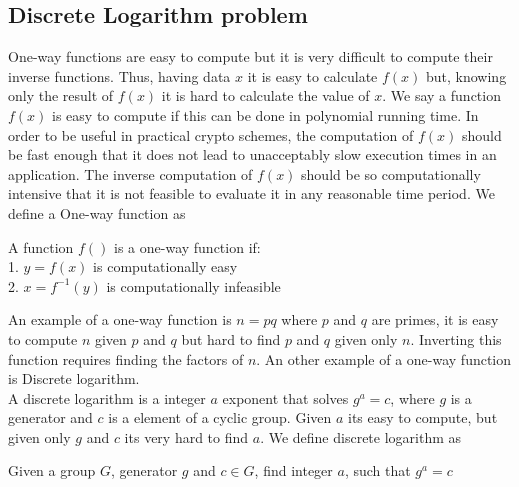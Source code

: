 \subsection{Discrete Logarithm problem} %

 One-way functions are easy to compute but it is very difficult to compute their inverse functions. Thus, having data $x$ it is easy to calculate $f(x)$ but,  
knowing only the result of $f(x)$ it is hard to calculate the value of $x$. We say a function $f(x)$ is easy to compute if this can be done in polynomial running time. 
In order to be useful in practical crypto schemes, the computation of $f(x)$ should be fast enough that it does not lead to unacceptably slow execution times in an application. The inverse
computation of $f(x)$ should be so computationally intensive that it is not feasible to evaluate it in any reasonable time period. We define a One-way function as \\

\begin{defi}
A function $f()$ is a one-way function if:      \\
1. $y = f (x)$ is computationally easy           \\
2. $x = f^{-1}(y)$ is computationally infeasible    
\end{defi}

\noindent
An example of a one-way function is $n = pq$ where $p$ and $q$ are primes, it is easy to compute $n$ given $p$ and $q$ but hard to find $p$ and $q$ given only $n$. 
Inverting this function requires finding the factors of $n$.
An other example of a one-way function is Discrete logarithm. \\


 A discrete logarithm is a integer $a$ exponent that solves $g^a=c$, where $g$ is a generator and $c$ is a element of a cyclic group. Given $a$ its easy to compute, but given only $g$ and $c$ its very hard to find $a$. We define discrete logarithm as \\

\begin{defi}
Given a group $G$, generator $g$ and $c \in G$, find integer $a$, such that $g^a = c$
\end{defi}


